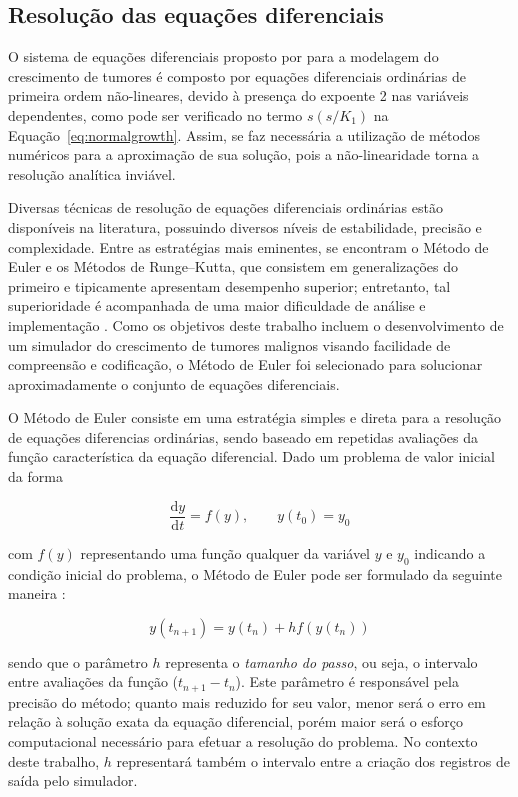 \documentclass[12pt]{article}
\begin{document}
\subsection{Resolução das equações diferenciais} \label{sec:numerical}

O sistema de equações diferenciais proposto por \cite{Panetta1996} para a modelagem do crescimento de tumores é composto por equações diferenciais ordinárias de primeira ordem não-lineares, devido à presença do expoente 2 nas variáveis dependentes, como pode ser verificado no termo $s(s / K_1)$ na Equação~\ref{eq:normalgrowth}. Assim, se faz necessária a utilização de métodos numéricos para a aproximação de sua solução, pois a não-linearidade torna a resolução analítica inviável.

Diversas técnicas de resolução de equações diferenciais ordinárias estão disponíveis na literatura, possuindo diversos níveis de estabilidade, precisão e complexidade. Entre as estratégias mais eminentes, se encontram o Método de Euler e os Métodos de Runge--Kutta, que consistem em generalizações do primeiro e tipicamente apresentam desempenho superior; entretanto, tal superioridade é acompanhada de uma maior dificuldade de análise e implementação \cite{Butcher2016}. Como os objetivos deste trabalho incluem o desenvolvimento de um simulador do crescimento de tumores malignos visando facilidade de compreensão e codificação, o Método de Euler foi selecionado para solucionar aproximadamente o conjunto de equações diferenciais.

O Método de Euler consiste em uma estratégia simples e direta para a resolução de equações diferencias ordinárias, sendo baseado em repetidas avaliações da função característica da equação diferencial. Dado um problema de valor inicial da forma

\begin{equation}
  \frac{\mathrm{d} y}{\mathrm{d} t} = f(y), \qquad y(t_{0}) = y_{0}
\end{equation}

\noindent com $f(y)$ representando uma função qualquer da variável $y$ e $y_{0}$ indicando a condição inicial do problema, o Método de Euler pode ser formulado da seguinte maneira \cite{Butcher2016}:

\begin{equation}
  y(t_{n+1}) = y(t_{n}) + h f(y(t_{n}))
\end{equation}

\noindent sendo que o parâmetro $h$ representa o \emph{tamanho do passo}, ou seja, o intervalo entre avaliações da função ($t_{n+1} - t_{n}$). Este parâmetro é responsável pela precisão do método; quanto mais reduzido for seu valor, menor será o erro em relação à solução exata da equação diferencial, porém maior será o esforço computacional necessário para efetuar a resolução do problema. No contexto deste trabalho, $h$ representará também o intervalo entre a criação dos registros de saída pelo simulador.
\end{document}
